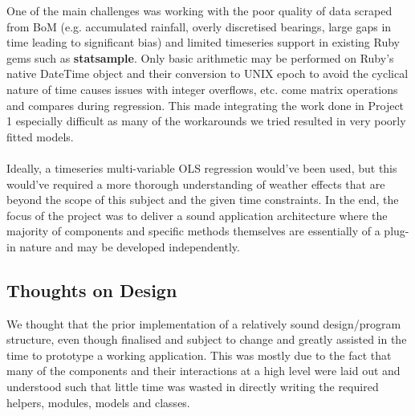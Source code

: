 \documentclass[10pt]{article}
\begin{document}
\noindent One of the main challenges was working with the poor quality of data scraped from BoM (e.g. accumulated rainfall, overly discretised bearings, large gaps in time leading to significant bias) and limited timeseries support in existing Ruby gems such as \textbf{statsample}. Only basic arithmetic may be performed on Ruby's native DateTime object and their conversion to UNIX epoch to avoid the cyclical nature of time causes issues with integer overflows, etc. come matrix operations and compares during regression. This made integrating the work done in Project 1 especially difficult as many of the workarounds we tried resulted in very poorly fitted models. \\\\
Ideally, a timeseries multi-variable OLS regression would've been used, but this would've required a more thorough understanding of weather effects that are beyond the scope of this subject and the given time constraints. In the end, the focus of the project was to deliver a sound application architecture where the majority of components and specific methods themselves are essentially of a plug-in nature and may be developed independently.

\subsection*{Thoughts on Design}

\noindent We thought that the prior implementation of a relatively sound design/program structure, even though finalised and subject to change and greatly assisted in the time to prototype a working application. This was mostly due to the fact that many of the components and their interactions at a high level were laid out and understood such that little time was wasted in directly writing the required helpers, modules, models and classes.
\end{document}
